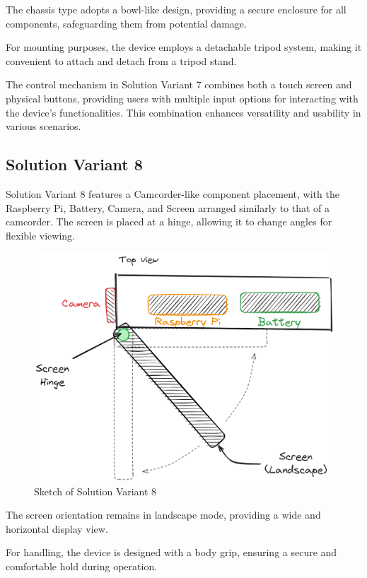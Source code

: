 The chassis type adopts a bowl-like design, providing a secure enclosure for all components, safeguarding them from potential damage.

For mounting purposes, the device employs a detachable tripod system, making it convenient to attach and detach from a tripod stand.

The control mechanism in Solution Variant 7 combines both a touch screen and physical buttons, providing users with multiple input options for interacting with the device's functionalities. This combination enhances versatility and usability in various scenarios.

\subsection{Solution Variant 8}
Solution Variant 8 features a Camcorder-like component placement, with the Raspberry Pi, Battery, Camera, and Screen arranged similarly to that of a camcorder. The screen is placed at a hinge, allowing it to change angles for flexible viewing.

\begin{figure}[ht!]
    \centering
    \includegraphics[width=\linewidth]{texs/Part1/chapter3/image/v8.png}
    \caption{Sketch of Solution Variant 8}
    \label{fig:sketch-solution-variant-8}
\end{figure}

The screen orientation remains in landscape mode, providing a wide and horizontal display view.

For handling, the device is designed with a body grip, ensuring a secure and comfortable hold during operation.


